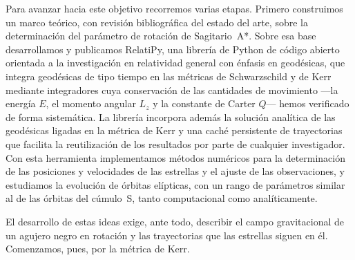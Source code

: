 Para avanzar hacia este objetivo recorremos varias etapas. Primero construimos un marco teórico, con revisión bibliográfica del estado del arte, sobre la determinación del parámetro de rotación de Sagitario~A*. Sobre esa base desarrollamos y publicamos RelatiPy, una librería de Python de código abierto orientada a la investigación en relatividad general con énfasis en geodésicas, que integra geodésicas de tipo tiempo en las métricas de Schwarzschild y de Kerr mediante integradores cuya conservación de las cantidades de movimiento —la energía $E$, el momento angular $L_z$ y la constante de Carter $Q$— hemos verificado de forma sistemática. La librería incorpora además la solución analítica de las geodésicas ligadas en la métrica de Kerr \cite{fujita2009analytical} y una caché persistente de trayectorias que facilita la reutilización de los resultados por parte de cualquier investigador. Con esta herramienta implementamos métodos numéricos para la determinación de las posiciones y velocidades de las estrellas y el ajuste de las observaciones, y estudiamos la evolución de órbitas elípticas, con un rango de parámetros similar al de las órbitas del cúmulo~S, tanto computacional como analíticamente.

El desarrollo de estas ideas exige, ante todo, describir el campo gravitacional de un agujero negro en rotación y las trayectorias que las estrellas siguen en él. Comenzamos, pues, por la métrica de Kerr.
